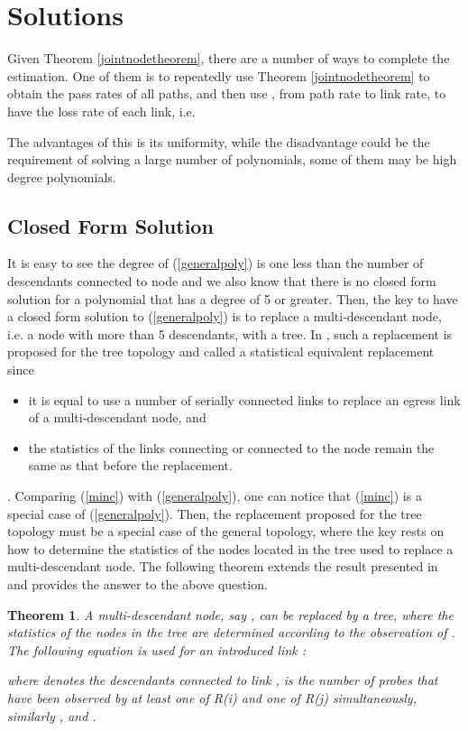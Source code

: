 \documentclass[10pt,twocolumn]{IEEEtran}
\newtheorem{theorem}{\hspace*{1pc}Theorem}
\begin{document}
\section{Solutions}

Given Theorem \ref{jointnodetheorem}, there are a number of ways  to
complete the estimation. One of them is to repeatedly use Theorem
\ref{jointnodetheorem} to obtain the pass rates of all paths, and then
use , from path rate to link rate, to have the loss rate
of each link, i.e.

 The advantages of this is its uniformity,
while the disadvantage could be the requirement of solving a large
number of polynomials, some of them may be  high degree polynomials.

\subsection{Closed Form Solution}

It is easy to see the degree of (\ref{generalpoly}) is one less than
the number of descendants connected to node  and we also know that
there is no closed form solution for a polynomial that has a degree of
5 or greater. Then, the key to have a closed form solution to
(\ref{generalpoly}) is to replace a multi-descendant node, i.e.  a
node with more than 5 descendants, with a tree. In \cite{ZD09}, such a
replacement is proposed for the tree topology and called a statistical
equivalent replacement since \begin{itemize} \item it is equal to use
a number of serially connected links to replace an egress link of a
multi-descendant node, and \item the statistics of the links
connecting or connected to the node remain the same as that before the
replacement. \end{itemize}. Comparing (\ref{minc}) with
(\ref{generalpoly}), one can notice that (\ref{minc}) is a special
case of (\ref{generalpoly}). Then, the replacement proposed for the
tree topology must be a special case of the general topology, where
the key rests on how to determine the statistics of the nodes located
in the tree used to replace a multi-descendant node. The following
theorem extends the result presented in \cite{ZD09} and provides the
answer to the above question.

\begin{theorem} \label{virtual link}
A multi-descendant node, say ,  can be replaced by a tree, where
the statistics of the nodes in the tree are determined according to
the observation of .  The following equation is used for an
introduced link :



\noindent where  denotes the descendants connected to link ,
 is the number
of probes that have been observed by at least one of R(i) and one of
R(j) simultaneously, similarly , and .
\end{theorem}
\end{document}
